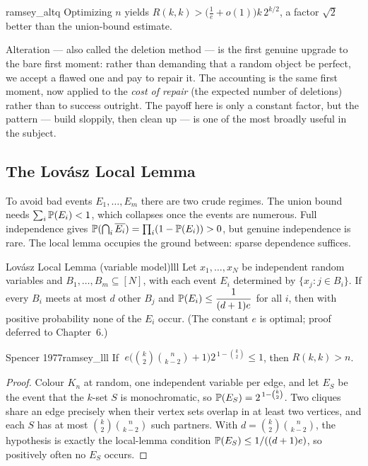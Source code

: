 \begin{remark}{}{ramsey_altq}
Optimizing $n$ yields $R(k,k)>\bigl(\tfrac1e+o(1)\bigr)k\,2^{k/2}$, a factor
$\sqrt2$ better than the union-bound estimate.
\end{remark}

\begin{insight}
Alteration --- also called the deletion method --- is the first genuine upgrade
to the bare first moment: rather than demanding that a random object be perfect,
we accept a flawed one and pay to repair it. The accounting is the same first
moment, now applied to the \emph{cost of repair} (the expected number of
deletions) rather than to success outright. The payoff here is only a constant
factor, but the pattern --- build sloppily, then clean up --- is one of the
most broadly useful in the subject.
\end{insight}

\subsection*{The Lov\'asz Local Lemma}

To avoid bad events $E_1,\dots,E_m$ there are two crude regimes. The union
bound needs $\sum_i\mathbb{P}(E_i)<1$, which collapses once the events are
numerous. Full independence gives
$\mathbb{P}(\bigcap_i \overline{E_i})=\prod_i(1-\mathbb{P}(E_i))>0$, but genuine
independence is rare. The local lemma occupies the ground between: sparse
dependence suffices.

\begin{theorem}{Lov\'asz Local Lemma (variable model)}{lll}
Let $x_1,\dots,x_N$ be independent random variables and
$B_1,\dots,B_m\subseteq[N]$, with each event $E_i$ determined by
$\{x_j:j\in B_i\}$. If every $B_i$ meets at most $d$ other $B_j$ and
$\mathbb{P}(E_i)\le\dfrac{1}{(d+1)e}$ for all $i$, then with positive probability
none of the $E_i$ occur. (The constant $e$ is optimal; proof deferred to
Chapter~6.)
\end{theorem}

\begin{theorem}{Spencer 1977}{ramsey_lll}
If $\;e\bigl(\binom k2\binom{n}{k-2}+1\bigr)2^{\,1-\binom k2}\le 1$, then
$R(k,k)>n$.
\end{theorem}

\begin{proof}
Colour $K_n$ at random, one independent variable per edge, and let $E_S$ be the
event that the $k$-set $S$ is monochromatic, so $\mathbb{P}(E_S)=2^{\,1-\binom k2}$.
Two cliques share an edge precisely when their vertex sets overlap in at least
two vertices, and each $S$ has at most $\binom k2\binom{n}{k-2}$ such partners.
With $d=\binom k2\binom{n}{k-2}$, the hypothesis is exactly the local-lemma
condition $\mathbb{P}(E_S)\le 1/((d+1)e)$, so positively often no $E_S$ occurs.
\end{proof}

